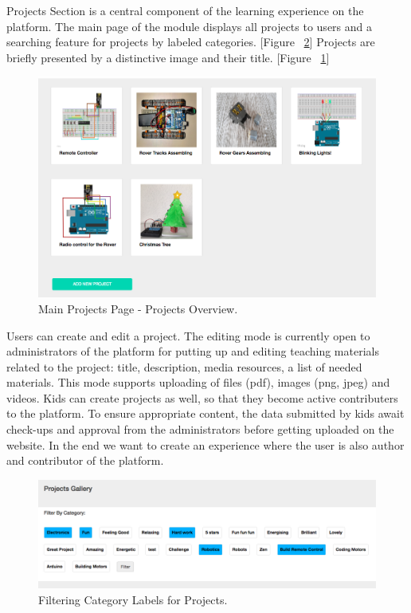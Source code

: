 Projects Section is a central component of the learning experience on the platform.
The main page of the module displays all projects to users and a searching feature for projects by labeled categories. [Figure ~\ref{fig:labels}] Projects are briefly presented by a distinctive image and their title. [Figure ~\ref{fig:projects_display}]\\

\begin{figure}
\includegraphics[width=1\linewidth]{images/ui/DisplayProjects.png}
\caption{Main Projects Page - Projects Overview.}
\label{fig:projects_display}
\end{figure}

Users can create and edit a project. The editing mode is currently open to administrators of the platform for putting up and editing teaching materials related to the project: title, description, media resources, a list of needed materials. This mode supports uploading of files (pdf), images (png, jpeg) and videos.
Kids can create projects as well, so that they become active contributers to the platform. To ensure appropriate content, the data submitted by kids await check-ups and approval from the administrators before getting uploaded on the website.
In the end we want to create an experience where the user is also author and contributor of the platform. \\

\begin{figure}
\includegraphics[width=1\linewidth]{images/ui/Labels.png}
\caption{Filtering Category Labels for Projects.}
\label{fig:labels}
\end{figure}


